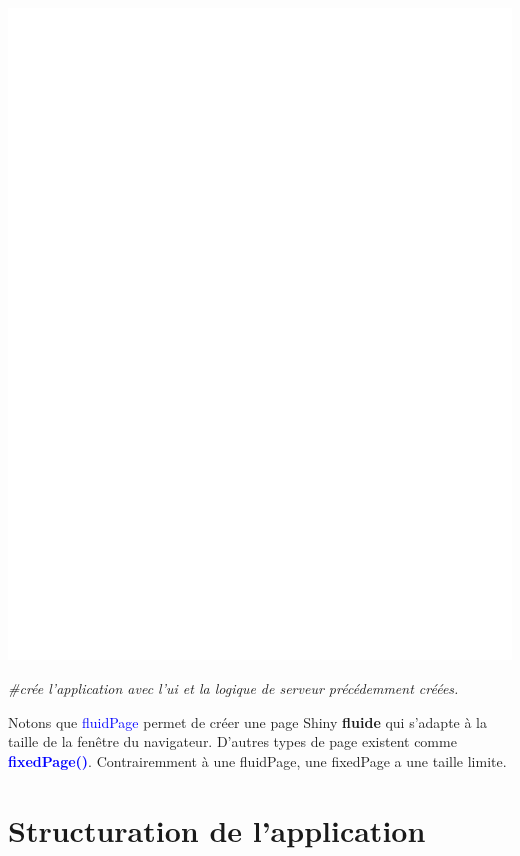 \documentclass[
]{article}
\newenvironment{Shaded}{\begin{snugshade}}{\end{snugshade}}
\newcommand{\CommentTok}[1]{\textcolor[rgb]{0.56,0.35,0.01}{\textit{#1}}}
\begin{document}
\includegraphics{proj_shiny_files/figure-latex/Application_minimale-1.pdf}

\begin{Shaded}
\begin{Highlighting}[]
\CommentTok{\#crée l’application avec l’ui et la logique de serveur précédemment créées.}
\end{Highlighting}
\end{Shaded}

Notons que \textcolor{blue}{fluidPage} permet de créer une page Shiny
\textbf{fluide} qui s'adapte à la taille de la fenêtre du navigateur.
D'autres types de page existent comme
\textbf{\textcolor{blue}{fixedPage()}}. Contrairemment à une fluidPage,
une fixedPage a une taille limite.

\newpage

\hypertarget{structuration-de-lapplication}{%
\section{Structuration de
l'application}\label{structuration-de-lapplication}}
\end{document}
